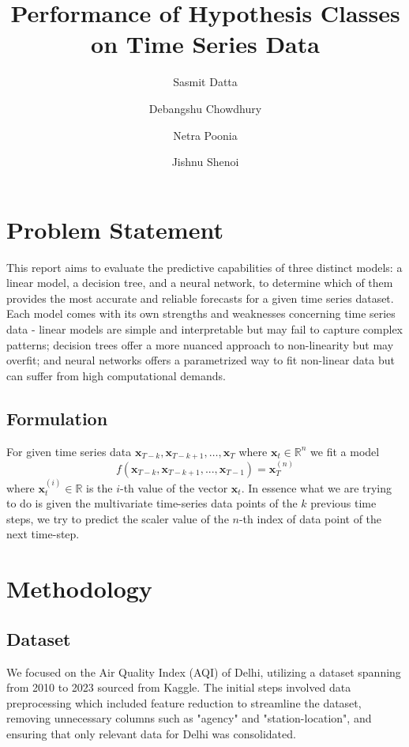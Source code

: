 \documentclass[12pt,a4paper]{article}
\title{\textbf{Performance of Hypothesis Classes on Time Series Data}}
\author{
  Sasmit Datta\and
  Debangshu Chowdhury\and
  Netra Poonia\and
  Jishnu Shenoi
}
\date{}
\begin{document}
\maketitle

\section{Problem Statement}
This report aims to evaluate the predictive capabilities of three distinct models: a linear model, a decision tree, and a neural network, to determine which of them provides the most accurate and reliable forecasts for a given time series dataset. Each model comes with its own strengths and weaknesses concerning time series data - linear models are simple and interpretable but may fail to capture complex patterns; decision trees offer a more nuanced approach to non-linearity but may overfit; and neural networks offers a parametrized way to fit non-linear data but can suffer from high computational demands.
\subsection{Formulation}
For given time series data $\mathbf{x}_{T-k},\mathbf{x}_{T-k+1},\hdots,\mathbf{x}_{T}$ where $\mathbf{x}_t\in \mathbb{R}^n$ we fit a model 
\begin{equation}
f(\mathbf{x}_{T-k},\mathbf{x}_{T-k+1},...,\mathbf{x}_{T-1}) = \mathbf{x}_{T}^{(n)}
\end{equation}
where $\mathbf{x}_{t}^{(i)}\in \mathbb{R}$ is the $i$-th value of the vector $\mathbf{x}_{t}$. In essence what we are trying to do is given the multivariate time-series data points of the $k$ previous time steps, we try to predict the scaler value of the $n$-th index of data point of the next time-step.

\section{Methodology}

\subsection{Dataset}
We focused on the Air Quality Index (AQI) of Delhi, utilizing a dataset spanning from 2010 to 2023 sourced from Kaggle. The initial steps involved data preprocessing which included feature reduction to streamline the dataset, removing unnecessary columns such as "agency" and "station-location", and ensuring that only relevant data for Delhi was consolidated.
\end{document}
